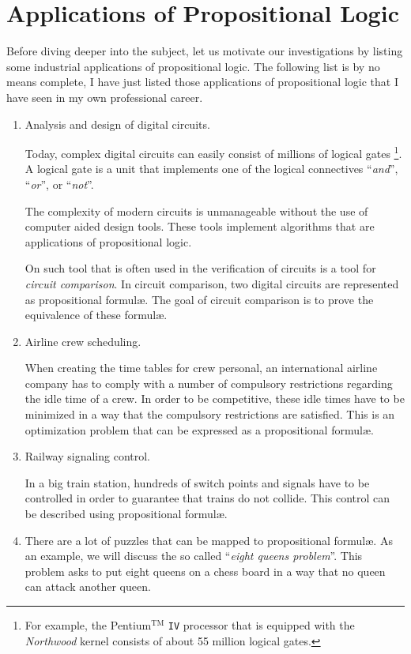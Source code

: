 \section{Applications of Propositional Logic}
Before diving deeper into the subject, let us motivate our investigations by 
listing some industrial applications of propositional logic.   The following list is by no means 
complete, I have just listed those applications of propositional logic that I have seen in my own
professional career.

\begin{enumerate}
\item Analysis and design of digital circuits.

      Today, complex digital circuits can easily consist of millions of logical gates
      \footnote{
        For example, the Pentium$^\mathrm{TM}$ \texttt{IV} processor that is equipped with
        the \textsl{Northwood} kernel consists of about  55 million logical gates.}.  
      A logical gate is a unit that implements one of the logical connectives
      ``\emph{and}'', ``\emph{or}'', or ``\emph{not}''.
  
      The complexity of modern circuits is unmanageable without the use of computer aided design
      tools.  These tools implement algorithms that are applications of propositional logic.

      On such tool that is often used in the verification of circuits is a tool for
      \emph{circuit comparison}.  In circuit comparison, two digital
      circuits are represented as propositional {formul\ae}.  The goal of circuit comparison is to
      prove the equivalence of these {formul\ae}.
\item Airline crew scheduling.

      When creating the time tables for crew personal, an international airline company
      has to comply with a number of compulsory restrictions regarding the idle time of a 
      crew.  In order to be competitive, these idle times have to be minimized in a way that the
      compulsory restrictions are satisfied.  This is an optimization problem that can be expressed
      as a propositional {formul\ae}.
\item Railway signaling control.

      In a big train station, hundreds of switch points and signals have to be controlled in order
      to guarantee that trains do not collide.  This control can be described using propositional
      {formul\ae}.
\item There are a lot of puzzles that can be mapped to propositional {formul\ae}.
      As an example, we will discuss the so called ``\emph{eight queens problem}''.
      This problem asks to put eight queens on a chess board in a way that no queen can attack
      another queen.
\end{enumerate}


